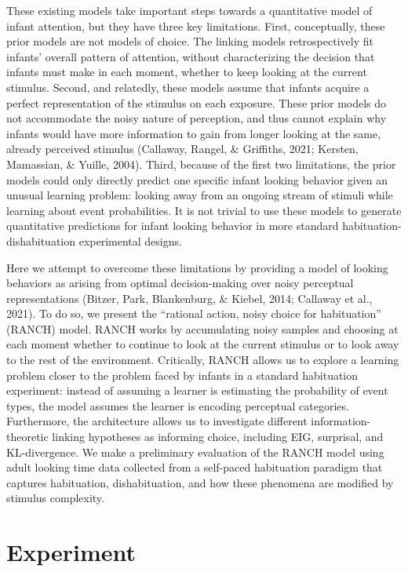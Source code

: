 \documentclass[10pt, letterpaper]{article}
\begin{document}
These existing models take important steps towards a quantitative model
of infant attention, but they have three key limitations. First,
conceptually, these prior models are not models of choice. The linking
models retrospectively fit infants' overall pattern of attention,
without characterizing the decision that infants must make in each
moment, whether to keep looking at the current stimulus. Second, and
relatedly, these models assume that infants acquire a perfect
representation of the stimulus on each exposure. These prior models do
not accommodate the noisy nature of perception, and thus cannot explain
why infants would have more information to gain from longer looking at
the same, already perceived stimulus (Callaway, Rangel, \& Griffiths,
2021; Kersten, Mamassian, \& Yuille, 2004). Third, because of the first
two limitations, the prior models could only directly predict one
specific infant looking behavior given an unusual learning problem:
looking away from an ongoing stream of stimuli while learning about
event probabilities. It is not trivial to use these models to generate
quantitative predictions for infant looking behavior in more standard
habituation-dishabituation experimental designs.

Here we attempt to overcome these limitations by providing a model of
looking behaviors as arising from optimal decision-making over noisy
perceptual representations (Bitzer, Park, Blankenburg, \& Kiebel, 2014;
Callaway et al., 2021). To do so, we present the ``rational action,
noisy choice for habituation'' (RANCH) model. RANCH works by
accumulating noisy samples and choosing at each moment whether to
continue to look at the current stimulus or to look away to the rest of
the environment. Critically, RANCH allows us to explore a learning
problem closer to the problem faced by infants in a standard habituation
experiment: instead of assuming a learner is estimating the probability
of event types, the model assumes the learner is encoding perceptual
categories. Furthermore, the architecture allows us to investigate
different information-theoretic linking hypotheses as informing choice,
including EIG, surprisal, and KL-divergence. We make a preliminary
evaluation of the RANCH model using adult looking time data collected
from a self-paced habituation paradigm that captures habituation,
dishabituation, and how these phenomena are modified by stimulus
complexity.

\hypertarget{experiment}{%
\section{Experiment}\label{experiment}}
\end{document}
